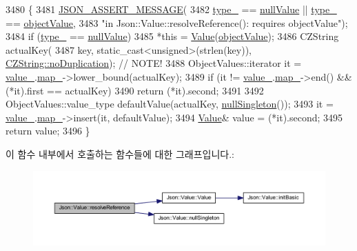 \begin{DoxyCode}
3480                                               \{
3481   \hyperlink{json_8h_ad7facdeeca0f495765e3b204c265eadb}{JSON\_ASSERT\_MESSAGE}(
3482       \hyperlink{class_json_1_1_value_abd222c2536dc88bf330dedcd076d2356}{type\_} == \hyperlink{namespace_json_a7d654b75c16a57007925868e38212b4ea7d9899633b4409bd3fc107e6737f8391}{nullValue} || \hyperlink{class_json_1_1_value_abd222c2536dc88bf330dedcd076d2356}{type\_} == \hyperlink{namespace_json_a7d654b75c16a57007925868e38212b4eae8386dcfc36d1ae897745f7b4f77a1f6}{objectValue},
3483       \textcolor{stringliteral}{"in Json::Value::resolveReference(): requires objectValue"});
3484   \textcolor{keywordflow}{if} (\hyperlink{class_json_1_1_value_abd222c2536dc88bf330dedcd076d2356}{type\_} == \hyperlink{namespace_json_a7d654b75c16a57007925868e38212b4ea7d9899633b4409bd3fc107e6737f8391}{nullValue})
3485     *\textcolor{keyword}{this} = \hyperlink{class_json_1_1_value_ada6ba1369448fb0240bccc36efaa46f7}{Value}(\hyperlink{namespace_json_a7d654b75c16a57007925868e38212b4eae8386dcfc36d1ae897745f7b4f77a1f6}{objectValue});
3486   CZString actualKey(
3487       key, static\_cast<unsigned>(strlen(key)), \hyperlink{class_json_1_1_value_1_1_c_z_string_a2805c46fb4a72bbaed55de6d75941b6da08d540450fa6c4af57eaacf063eedd20}{CZString::noDuplication}); \textcolor{comment}{// NOTE!}
3488   ObjectValues::iterator it = \hyperlink{class_json_1_1_value_aef578244546212705b9f81eb84d7e151}{value\_}.\hyperlink{union_json_1_1_value_1_1_value_holder_a1e7a5b86d4f52234f55c847ad1ce389a}{map\_}->lower\_bound(actualKey);
3489   \textcolor{keywordflow}{if} (it != \hyperlink{class_json_1_1_value_aef578244546212705b9f81eb84d7e151}{value\_}.\hyperlink{union_json_1_1_value_1_1_value_holder_a1e7a5b86d4f52234f55c847ad1ce389a}{map\_}->end() && (*it).first == actualKey)
3490     \textcolor{keywordflow}{return} (*it).second;
3491 
3492   ObjectValues::value\_type defaultValue(actualKey, \hyperlink{class_json_1_1_value_af2f124567acc35d021a424e53ebdfcab}{nullSingleton}());
3493   it = \hyperlink{class_json_1_1_value_aef578244546212705b9f81eb84d7e151}{value\_}.\hyperlink{union_json_1_1_value_1_1_value_holder_a1e7a5b86d4f52234f55c847ad1ce389a}{map\_}->insert(it, defaultValue);
3494   \hyperlink{class_json_1_1_value}{Value}& value = (*it).second;
3495   \textcolor{keywordflow}{return} value;
3496 \}
\end{DoxyCode}
이 함수 내부에서 호출하는 함수들에 대한 그래프입니다.\+:\nopagebreak
\begin{figure}[H]
\begin{center}
\leavevmode
\includegraphics[width=350pt]{class_json_1_1_value_a9ff9cdae2c8f4155bab603d750b0b3f1_cgraph}
\end{center}
\end{figure}
